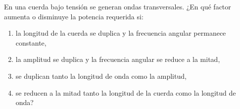 \item En una cuerda bajo tensión se generan ondas transversales. ¿En qué factor aumenta o disminuye la potencia requerida si:
\begin{enumerate}
    \item la longitud de la cuerda se duplica y la frecuencia angular permanece constante,
    \item la amplitud se duplica y la frecuencia angular se reduce a la mitad,
    \item se duplican tanto la longitud de onda como la amplitud,
    \item se reducen a la mitad tanto la longitud de la cuerda como la longitud de onda?
\end{enumerate}